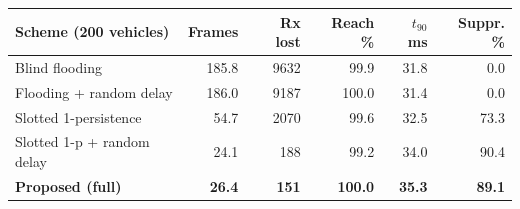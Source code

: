 \small
\renewcommand{\arraystretch}{1.2}
\begin{tabular}{lrrrrr}
\toprule
Scheme (200 vehicles) & Frames & Rx lost & Reach \% & $t_{90}$ ms & Suppr. \% \\
\midrule
Blind flooding & 185.8 & 9632 & 99.9 & 31.8 & 0.0 \\
Flooding + random delay & 186.0 & 9187 & 100.0 & 31.4 & 0.0 \\
Slotted 1-persistence & 54.7 & 2070 & 99.6 & 32.5 & 73.3 \\
Slotted 1-p + random delay & 24.1 & 188 & 99.2 & 34.0 & 90.4 \\
\textbf{Proposed (full)} & \textbf{26.4} & \textbf{151} & \textbf{100.0} & \textbf{35.3} & \textbf{89.1} \\
\bottomrule
\end{tabular}
